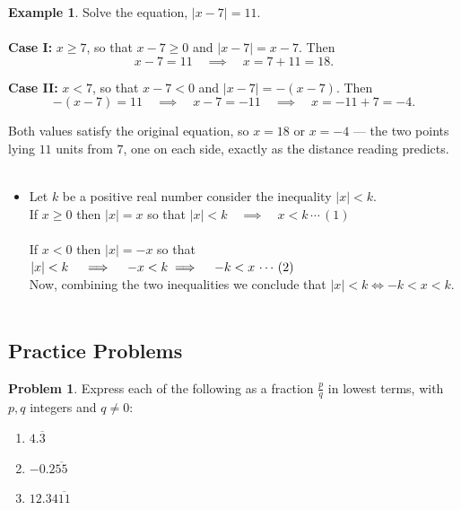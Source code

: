 \documentclass[11pt,a4paper]{article}
\theoremstyle{definition}
\newtheorem{example}[thm]{Example}
\newtheorem{problemx}{Problem}[section]
\newenvironment{problem}{\begin{problemx}}{\end{problemx}}
\begin{document}
\begin{example}

Solve the equation, $|x-7|=11$.\\\\

\textbf{Case I:} $x\geq 7$, so that $x-7\geq 0$ and $\left|x-7\right|=x-7$. Then
$$x-7=11\quad \implies\quad  x=7+11=18 .$$

\textbf{Case II:} $x<7$, so that $x-7<0$ and $\left|x-7\right|=-(x-7)$. Then
$$-(x-7)=11\quad \implies\quad  x-7=-11
\quad \implies\quad  x=-11+7=-4 .$$

Both values satisfy the original equation, so $x=18$ or $x=-4$ --- the two points
lying $11$ units from $7$, one on each side, exactly as the distance reading
predicts.\\\\

\begin{itemize}
\item Let $k$ be a positive real number consider the inequality $|x|<k$.\\
If $x\geq 0$ then $|x|=x$ so that $|x|<k\quad  \implies \quad  x<k\, \cdots\,(1)$\\ \\ 
If $x<0$ then $|x|=-x$ so that $|x|<k\quad  \implies \quad  -x<k\quad \\ \implies \quad  -k<x\, \cdots \, (2)$\\
Now, combining the two inequalities we conclude that $|x|<k \iff -k<x<k$.\\\\
\end{itemize}
\end{example}
\pagebreak

\subsection{Practice Problems}

\begin{problem}
Express each of the following as a fraction $\frac{p}{q}$ in lowest terms, with
$p,q$ integers and $q\neq 0$:
\begin{enumerate}
\item[(a).] $4.\overline{3}$
\item[(b).] $-0.2\overline{55}$
\item[(c).] $12.34\overline{11}$
\end{enumerate}
\end{problem}
\end{document}
